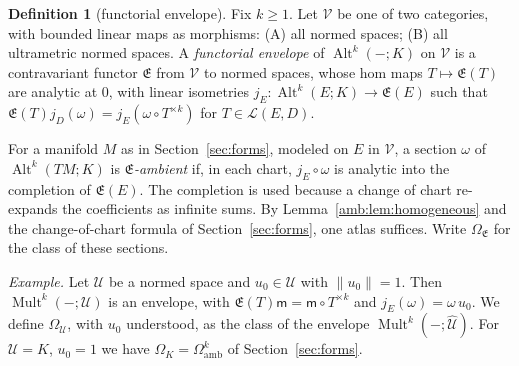 \documentclass[11pt]{amsart}
\theoremstyle{definition}
\newtheorem{definition}[theorem]{Definition}
\theoremstyle{remark}
\numberwithin{equation}{section}
\newcommand{\cL}{\mathcal L}
\newcommand{\Alt}{\operatorname{Alt}}
\newcommand{\Mult}{\operatorname{Mult}}
\newcommand{\norm}[1]{\lVert #1\rVert}
\theoremstyle{plain}
\theoremstyle{definition}
\theoremstyle{plain}
\begin{document}
\begin{definition}[functorial envelope]\label{amb:def:envelope}
Fix $k\ge1$. Let $\mathcal V$ be one of two categories, with bounded linear maps as morphisms: (A) all normed spaces; (B) all ultrametric normed spaces. A \emph{functorial envelope} of $\Alt^k(-;K)$ on $\mathcal V$ is a contravariant functor $\mathfrak E$ from $\mathcal V$ to normed spaces, whose hom maps $T\mapsto\mathfrak E(T)$ are analytic at $0$, with linear isometries $j_E\colon\Alt^k(E;K)\to\mathfrak E(E)$ such that $\mathfrak E(T)j_D(\omega)=j_E(\omega\circ T^{\times k})$ for $T\in\cL(E,D)$.

For a manifold $M$ as in Section~\ref{sec:forms}, modeled on $E$ in $\mathcal V$, a section $\omega$ of $\Alt^k(TM;K)$ is \emph{$\mathfrak E$-ambient} if, in each chart, $j_E\circ\omega$ is analytic into the completion of $\mathfrak E(E)$. The completion is used because a change of chart re-expands the coefficients as infinite sums. By Lemma~\ref{amb:lem:homogeneous} and the change-of-chart formula of Section~\ref{sec:forms}, one atlas suffices. Write $\Omega_{\mathfrak E}$ for the class of these sections.

\emph{Example.} Let $\mathcal U$ be a normed space and $u_0\in\mathcal U$ with $\norm{u_0}=1$. Then $\Mult^k(-;\mathcal U)$ is an envelope, with $\mathfrak E(T)\mathsf m=\mathsf m\circ T^{\times k}$ and $j_E(\omega)=\omega\,u_0$. We define $\Omega_{\mathcal U}$, with $u_0$ understood, as the class of the envelope $\Mult^k(-;\widehat{\mathcal U})$. For $\mathcal U=K$, $u_0=1$ we have $\Omega_K=\Omega^k_{\mathrm{amb}}$ of Section~\ref{sec:forms}.


\end{definition}
\end{document}
